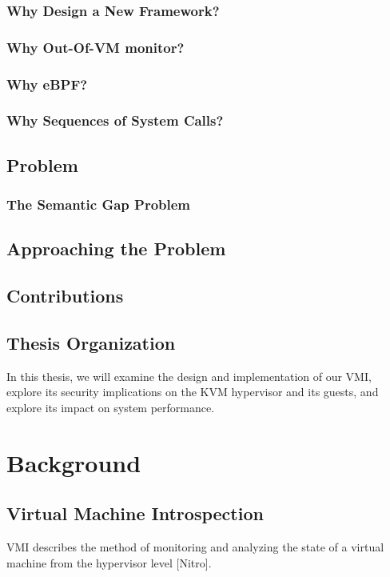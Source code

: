 \documentclass{report}
\begin{document}
\begin{spacing}{1.5}
\subsection{Why Design a New Framework?}
\subsection{Why Out-Of-VM monitor?}
\subsection{Why eBPF?}
\subsection{Why Sequences of System Calls?}

\section{Problem}
\subsection{The Semantic Gap Problem}
\section{Approaching the Problem}

\section{Contributions}

\section{Thesis Organization}

In this thesis, we will examine the design and implementation of our VMI, explore its security implications on the KVM hypervisor and its guests, and explore its impact on system performance.

\chapter{Background}
\section{Virtual Machine Introspection}

VMI describes the method of monitoring and analyzing the state of a virtual machine from the hypervisor level [Nitro]. 



\end{spacing}
\end{document}

